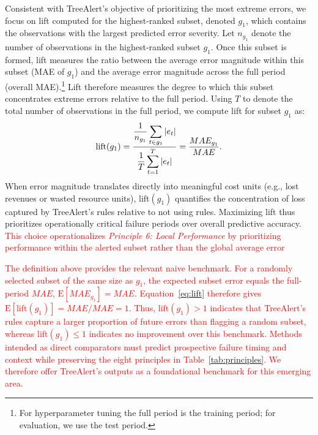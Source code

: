 \documentclass[12pt]{article}
\newcommand{\matt}[1]{\textcolor{red}{#1}}
\begin{document}
Consistent with TreeAlert’s objective of prioritizing the most extreme errors, we focus on lift computed for the highest-ranked subset, denoted \( g_{1} \), which contains the observations with the largest predicted error severity. Let \( n_{g_1} \) denote the number of observations in the highest-ranked subset \( g_{1} \). Once this subset is formed, lift measures the ratio between the average error magnitude within this subset (MAE of $g_1$) and the average  error magnitude across the full %
period (overall MAE).\footnote{For hyperparameter tuning the full period is the training period; for evaluation, we use the test period.} Lift therefore measures the degree to which this subset concentrates extreme errors relative to the full %
period. Using \( T \) to denote the total number of observations in the full %
period, we compute lift for subset \( g_{1} \) as:
\begin{equation}
\label{eq:lift}
\text{lift}(g_{1}) =
\frac{
\displaystyle \frac{1}{n_{g_1}}\sum_{t\in {g_1}} |e_t|
}{
\displaystyle \frac{1}{T}\sum_{t=1}^{T} |e_t|
} = \frac{MAE_{g_1}}{MAE}.
\end{equation}
When error magnitude translates directly into meaningful cost units (e.g., lost revenues or wasted resource units), $\text{lift}(g_1)$ quantifies the concentration of loss captured by TreeAlert's rules relative to not using rules. Maximizing lift thus prioritizes operationally critical failure periods over overall predictive
accuracy. \matt{This choice operationalizes \emph{Principle 6: Local Performance} by prioritizing performance within the alerted subset rather than the global average error} %

\matt{The definition above provides the relevant naive benchmark. For a randomly selected subset of the same size as $g_1$, the expected subset error equals the full-period $MAE$, $\mathrm{E}[MAE_{g_1}]=MAE$. Equation~\eqref{eq:lift} therefore gives $\mathrm{E}[\mathrm{lift}(g_1)]=MAE/MAE=1$. Thus, $\mathrm{lift}(g_1)>1$ indicates that TreeAlert's rules capture a larger proportion of future errors than flagging a random subset, whereas $\mathrm{lift}(g_1)\leq1$ indicates no improvement over this benchmark. Methods intended as direct comparators must predict prospective failure timing and context while preserving the eight principles in Table~\ref{tab:principles}. We therefore offer TreeAlert's outputs as a foundational benchmark for this emerging area.}
\end{document}
